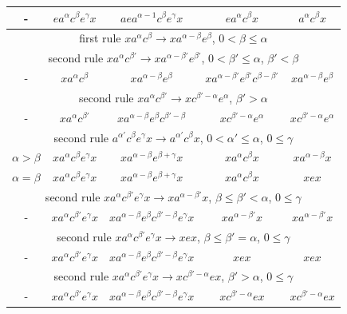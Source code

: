 \documentclass{article}
\theoremstyle{definition}
\begin{document}
\begin{center}
\begin{tabular}{|c|c|c|c|c|}
\hline
\hline
- & $  e a^\alpha c^\beta e^\gamma x   $ &  $  a e a^{\alpha-1} c^\beta e^\gamma x  $ &   $ e a^\alpha c^\beta x   $ &  $ a^\alpha c^{\beta} x  $ \\
\hline
\hline
\multicolumn{5}{|c|}{first rule $x a^\alpha c^\beta \rightarrow x a^{\alpha - \beta} e^\beta$, $0< \beta \le \alpha$}\\
\hline
\hline
\multicolumn{5}{|c|}{second rule $x a^\alpha c^{\beta'} \rightarrow x a^{\alpha - \beta'} e^{\beta'}$, $0< \beta' \le \alpha$, $\beta' < \beta$}\\
\hline
- & $ x a^\alpha c^\beta  $ &  $  x  a^{\alpha - \beta} e^\beta   $ &   $   x a^{\alpha - \beta'} e^{\beta'}  c^{\beta-\beta'}    $ &  $ x a^{\alpha - \beta} e^\beta  $ \\
\hline
\multicolumn{5}{|c|}{second rule $x a^\alpha c^{\beta'} \rightarrow x c^{\beta' -\alpha} e^{\alpha}$, $\beta' > \alpha$}\\
\hline
- & $ x a^\alpha c^{\beta'}  $ &  $  x  a^{\alpha - \beta} e^\beta  c^{\beta'-\beta}  $ &   $   x c^{\beta' -\alpha} e^{\alpha}  $ &  $ x  c^{\beta' -\alpha} e^{\alpha} $ \\
\hline
\multicolumn{5}{|c|}{second rule $a^{\alpha'} c^\beta e^\gamma x  \rightarrow a^{\alpha'} c^\beta x $, $0<\alpha' \le \alpha$, $0 \le \gamma$}\\
\hline
$\alpha > \beta$ &  $ x a^\alpha c^{\beta}  e^\gamma x $ &  $  x  a^{\alpha - \beta} e^{\beta+\gamma}  x $ &   $   x a^{\alpha} c^\beta  x  $ &  $ x  a^{\alpha - \beta} x $\\
\hline
$\alpha = \beta$  &  $ x a^\alpha c^{\beta}  e^\gamma x $ &  $  x  a^{\alpha - \beta} e^{\beta+\gamma}  x $ &   $   x a^{\alpha} c^\beta  x  $ &  $ x  e x $\\
\hline
\multicolumn{5}{|c|}{second rule $ x a^{\alpha} c^{\beta'} e^\gamma x  \rightarrow x a^{\alpha - \beta'} x $, $\beta \le \beta' < \alpha$, $0 \le \gamma$}\\
\hline
- &  $ x a^{\alpha} c^{\beta'} e^\gamma x $ &  $  x  a^{\alpha - \beta} e^{\beta} c^{\beta' -\beta} e^{\gamma}  x $ &   $   x a^{\alpha - \beta'}  x  $ &  $ x  a^{\alpha - \beta'} x $\\
\hline
\multicolumn{5}{|c|}{second rule $ x a^{\alpha} c^{\beta'} e^\gamma x  \rightarrow x e x $, $\beta \le \beta' = \alpha$, $0 \le \gamma$}\\
\hline
- &  $ x a^{\alpha} c^{\beta'} e^\gamma x $ &  $  x  a^{\alpha - \beta} e^{\beta} c^{\beta' -\beta} e^{\gamma}  x $ &   $   x e  x  $ &  $ x  e x $\\
\hline
\multicolumn{5}{|c|}{second rule $ x a^{\alpha} c^{\beta'} e^\gamma x  \rightarrow x  c^{\beta'-\alpha} e  x $, $ \beta' > \alpha$, $0 \le \gamma$}\\
\hline
- &  $ x a^{\alpha} c^{\beta'} e^\gamma x $ &  $  x  a^{\alpha - \beta} e^{\beta} c^{\beta' -\beta} e^{\gamma}  x $ &   $   x  c^{\beta'-\alpha} e  x  $ &  $ x   c^{\beta'-\alpha} e x $\\
\hline
\end{tabular}
\end{center}
\end{document}
